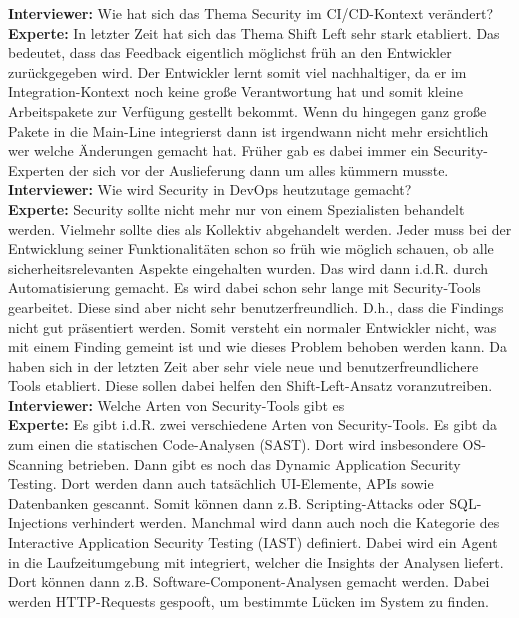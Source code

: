 \begin{linenumbers}
    \textbf{Interviewer:} Wie hat sich das Thema Security im CI/CD-Kontext verändert?\\
    \textbf{Experte:} In letzter Zeit hat sich das Thema Shift Left sehr stark etabliert. Das bedeutet, dass das Feedback eigentlich möglichst früh an den Entwickler zurückgegeben wird. Der Entwickler lernt somit viel nachhaltiger, da er im Integration-Kontext noch keine große Verantwortung hat und somit kleine Arbeitspakete zur Verfügung gestellt bekommt. Wenn du hingegen ganz große Pakete in die Main-Line integrierst dann ist irgendwann nicht mehr ersichtlich wer welche Änderungen gemacht hat. Früher gab es dabei immer ein Security-Experten der sich vor der Auslieferung dann um alles kümmern musste.\\
    \textbf{Interviewer:} Wie wird Security in DevOps heutzutage gemacht?\\
    \textbf{Experte:} Security sollte nicht mehr nur von einem Spezialisten behandelt werden. Vielmehr sollte dies als Kollektiv abgehandelt werden. Jeder muss bei der Entwicklung seiner Funktionalitäten schon so früh wie möglich schauen, ob alle sicherheitsrelevanten Aspekte eingehalten wurden. Das wird dann i.d.R. durch Automatisierung gemacht. Es wird dabei schon sehr lange mit Security-Tools gearbeitet. Diese sind aber nicht sehr benutzerfreundlich. D.h., dass die Findings nicht gut präsentiert werden. Somit versteht ein normaler Entwickler nicht, was mit einem Finding gemeint ist und wie dieses Problem behoben werden kann. Da haben sich in der letzten Zeit aber sehr viele neue und benutzerfreundlichere Tools etabliert. Diese sollen dabei helfen den Shift-Left-Ansatz voranzutreiben.\\
    \textbf{Interviewer:} Welche Arten von Security-Tools gibt es\\
    \textbf{Experte:} Es gibt i.d.R. zwei verschiedene Arten von Security-Tools. Es gibt da zum einen die statischen Code-Analysen (SAST). Dort wird insbesondere OS-Scanning betrieben. Dann gibt es noch das Dynamic Application Security Testing. Dort werden dann auch tatsächlich UI-Elemente, APIs sowie Datenbanken gescannt. Somit können dann z.B. Scripting-Attacks oder SQL-Injections verhindert werden. Manchmal wird dann auch noch die Kategorie des Interactive Application Security Testing (IAST) definiert. Dabei wird ein Agent in die Laufzeitumgebung mit integriert, welcher die Insights der Analysen liefert. Dort können dann z.B. Software-Component-Analysen gemacht werden. Dabei werden HTTP-Requests gespooft, um bestimmte Lücken im System zu finden.\\

\end{linenumbers}
